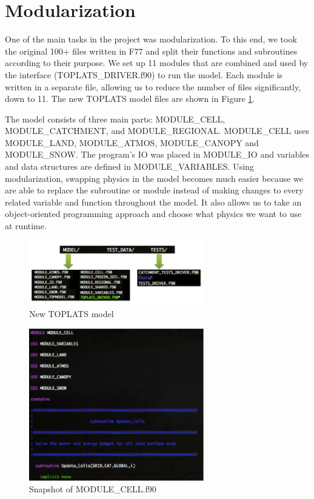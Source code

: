 \documentclass[pdftex,12pt,a4paper]{article}
\begin{document}
\section{Modularization}
One of the main tasks in the project was modularization. To this end, we took the original 100+ files written in F77 and split their functions and subroutines according to their purpose.  We set up 11 modules that are combined and used by the interface (TOPLATS\_DRIVER.f90) to run the model. Each module is written in a separate file, allowing us to reduce the number of files significantly, down to 11.  The new TOPLATS model files are shown in Figure \ref{Modules1}. 

The model consists of three main parts: MODULE\_CELL, MODULE\_CATCHMENT, and MODULE\_REGIONAL. MODULE\_CELL uses MODULE\_LAND, MODULE\_ATMOS, MODULE\_CANOPY and MODULE\_SNOW. The program's IO was placed in MODULE\_IO and variables and data structures are defined in MODULE\_VARIABLES. Using modularization, swapping physics in the model becomes much easier because we are able to replace the subroutine or module instead of making changes to every related variable and function throughout the model. It also allows us to take an object-oriented programming approach and choose what physics we want to use at runtime.

\begin{figure}[h]
	\centering
	\includegraphics[width=3.0in]{Figures/Modules1.png}
	\caption{New TOPLATS model}
	\label{Modules1}
\end{figure}

\begin{figure}[h]
	\centering
	\includegraphics[width=3.0in]{Figures/Modules2.png}
	\caption{Snapshot of MODULE\_CELL.f90}
	\label{Modules2}
\end{figure}
\end{document}
